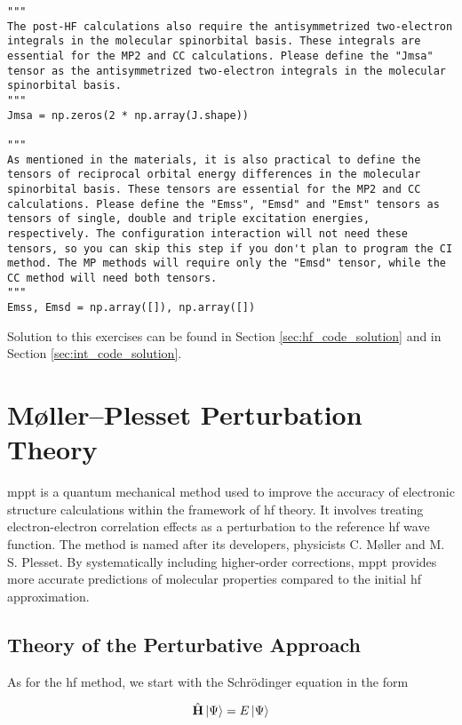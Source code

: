 \begin{lstlisting}
"""
The post-HF calculations also require the antisymmetrized two-electron integrals in the molecular spinorbital basis. These integrals are essential for the MP2 and CC calculations. Please define the "Jmsa" tensor as the antisymmetrized two-electron integrals in the molecular spinorbital basis.
"""
Jmsa = np.zeros(2 * np.array(J.shape))

"""
As mentioned in the materials, it is also practical to define the tensors of reciprocal orbital energy differences in the molecular spinorbital basis. These tensors are essential for the MP2 and CC calculations. Please define the "Emss", "Emsd" and "Emst" tensors as tensors of single, double and triple excitation energies, respectively. The configuration interaction will not need these tensors, so you can skip this step if you don't plan to program the CI method. The MP methods will require only the "Emsd" tensor, while the CC method will need both tensors.
"""
Emss, Emsd = np.array([]), np.array([])
\end{lstlisting}

Solution to this exercises can be found in Section \ref{sec:hf_code_solution} and in Section \ref{sec:int_code_solution}.
\chapter{Møller--Plesset Perturbation Theory}

\acrshort{mppt} is a quantum mechanical method used to improve the accuracy of electronic structure calculations within the framework of \acrshort{hf} theory. It involves treating electron-electron correlation effects as a perturbation to the reference \acrshort{hf} wave function. The method is named after its developers, physicists C. Møller and M. S. Plesset. By systematically including higher-order corrections, \acrshort{mppt} provides more accurate predictions of molecular properties compared to the initial \acrshort{hf} approximation.

\section{Theory of the Perturbative Approach}

As for the \acrshort{hf} method, we start with the Schrödinger equation in the form

\begin{equation}
\hat{\mathbf{H}}\ket{\Psi}=E\ket{\Psi}
\end{equation}

